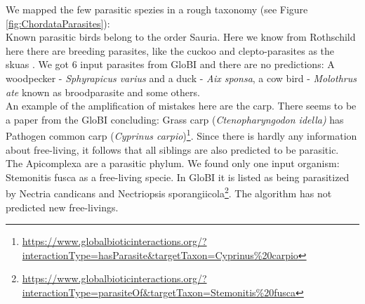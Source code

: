       We mapped the few parasitic spezies in a rough taxonomy (see Figure \ref{fig:ChordataParasites}): \\
      Known parasitic birds belong to the order Sauria. Here we know from Rothschild  here there are 
        breeding parasites, like the cuckoo and clepto-parasites as the skuas \cite{Rothschild1957}. We
        got 6 input parasites from GloBI and there are no predictions: A woodpecker - 
        \textit{Sphyrapicus varius} and a duck - \textit{Aix sponsa}, a cow bird - \textit{Molothrus ate} 
        known as broodparasite and some others. \\
      An example of the amplification of mistakes here are the carp. There seems to be a paper from the 
        GloBI concluding: Grass carp (\textit{Ctenopharyngodon idella)} has Pathogen common carp 
        (\textit{Cyprinus carpio})\footnote{
          \hyperlink{https://www.globalbioticinteractions.org/?interactionType=hasParasite&targetTaxon=Cyprinus\%20carpio}
          {https://www.globalbioticinteractions.org/?interactionType=hasParasite\&targetTaxon=Cyprinus\%20carpio}
        }. Since there is hardly any information about free-living, it follows that all siblings are 
        also predicted to be parasitic. \\

      The Apicomplexa are a parasitic phylum. We found only one input organism: Stemonitis fusca as a 
        free-living specie. In GloBI it is listed as being parasitized by Nectria candicans and Nectriopsis 
        sporangiicola\footnote{
          \hyperlink{https://www.globalbioticinteractions.org/?interactionType=parasiteOf&targetTaxon=Stemonitis\%20fusca}
          {https://www.globalbioticinteractions.org/?interactionType=parasiteOf\&targetTaxon=Stemonitis\%20fusca}
        }. The algorithm has not predicted new free-livings. \\

